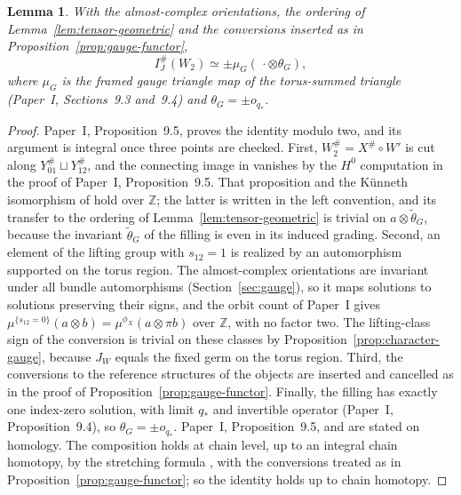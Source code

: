 \documentclass[11pt]{amsart}
\newtheorem{lemma}[theorem]{Lemma}
\theoremstyle{definition}
\theoremstyle{remark}
\theoremstyle{plain}
\numberwithin{equation}{section}
\newcommand{\ZZ}{\mathbb Z}
\newcommand{\IG}{I^{\#}_{J}}
\begin{document}
\begin{lemma}\label{lem:gauge-triangle-Z}
With the almost-complex orientations, the ordering of
Lemma~\ref{lem:tensor-geometric} and the conversions inserted as in
Proposition~\ref{prop:gauge-functor},
\[
 \IG(W_2)\simeq\pm\mu_G(\,\cdot\otimes\theta_G),
\]
where $\mu_G$ is the framed gauge triangle map of the torus-summed
triangle (Paper~I, Sections~9.3 and~9.4) and $\theta_G=\pm o_{q_*}$.
\end{lemma}
\begin{proof}
Paper~I, Proposition~9.5, proves the identity modulo two, and its
argument is integral once three points are checked. First,
$W_2^\#=X^\#\circ W'$ is cut along $Y_{01}^\#\sqcup Y_{12}^\#$, and the
connecting image in \cite[Proposition~5.4]{KM-unknot} vanishes by the
$H^0$ computation in the proof of Paper~I, Proposition~9.5. That proposition and the K\"unneth isomorphism
of \cite[Section~5.2]{KM-unknot} hold over $\ZZ$; the latter is written
in the left convention, and its transfer to the ordering of
Lemma~\ref{lem:tensor-geometric} is trivial on $a\otimes\widetilde\theta_G$,
because the invariant $\widetilde\theta_G$ of the filling is even in its
induced grading. Second, an element of
the lifting group with $s_{12}=1$ is realized by an automorphism
supported on the torus region. The almost-complex orientations are
invariant under all bundle automorphisms (Section~\ref{sec:gauge}), so
it maps solutions to solutions preserving their signs, and the orbit
count of Paper~I gives $\mu^{\{s_{12}=0\}}(a\otimes b)=\mu^{\phi_X}(a\otimes\pi b)$ over $\ZZ$, with no factor two. The lifting-class sign of the conversion is trivial on these classes by Proposition~\ref{prop:character-gauge}, because
$J_W$ equals the fixed germ on the torus region. Third, the
conversions to the reference structures of the objects are inserted and cancelled as in the
proof of Proposition~\ref{prop:gauge-functor}. Finally, the filling has
exactly one index-zero solution, with limit $q_*$ and invertible
operator (Paper~I, Proposition~9.4), so $\theta_G=\pm o_{q_*}$.
Paper~I, Proposition~9.5, and \cite[Proposition~5.4]{KM-unknot} are
stated on homology. The composition holds at chain level, up to an
integral chain homotopy, by the stretching formula
\cite[Section~3.9, (23)]{KM-unknot}, with the conversions treated as in
Proposition~\ref{prop:gauge-functor}; so the identity holds up to chain
homotopy.
\end{proof}
\end{document}
